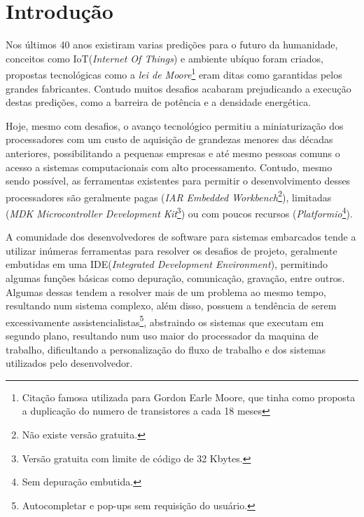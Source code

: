 \chapter{Introdução}
Nos últimos 40 anos existiram varias predições para o futuro da humanidade, conceitos como IoT(\textit{Internet Of Things})\cite{gates1995estrada} e ambiente ubíquo\cite{weiser1991computer} foram criados, propostas tecnológicas como a \textit{lei de Moore}\footnote{Citação famosa utilizada para Gordon Earle Moore, que tinha como proposta a duplicação do numero de transistores a cada 18 meses} eram ditas como garantidas pelos grandes fabricantes. Contudo muitos desafios acabaram prejudicando a execução destas predições, como a barreira de potência\cite{Patterson:2008:COD:1502247} e a densidade energética\cite{paradiso2005energy}.

Hoje, mesmo com desafios, o avanço tecnológico permitiu a miniaturização dos processadores com um custo de aquisição de grandezas menores das décadas anteriores\cite{nordhaus2007two}, possibilitando a pequenas empresas e até mesmo pessoas comuns o acesso a sistemas computacionais com alto processamento. Contudo, mesmo	 sendo possível, as ferramentas existentes para permitir o desenvolvimento desses processadores são geralmente pagas (\textit{IAR Embedded Workbench}\footnote{Não existe versão gratuita.}), limitadas (\textit{MDK Microcontroller Development Kit}\footnote{Versão gratuita com limite de código de 32 Kbytes.}) ou com poucos recursos (\textit{Platformio}\footnote{Sem depuração embutida.}).

A comunidade dos desenvolvedores de software para sistemas embarcados tende a utilizar inúmeras ferramentas para resolver os desafios de projeto, geralmente embutidas em uma IDE(\textit{Integrated Development Environment}), permitindo algumas funções básicas como depuração, comunicação, gravação, entre outros. Algumas dessas tendem a resolver mais de um problema ao mesmo tempo, resultando num sistema complexo, além disso, possuem a tendência de serem excessivamente assistencialistas\footnote{Autocompletar e pop-ups sem requisição do usuário.}, abstraindo os sistemas que executam em segundo plano, resultando num uso maior do processador da maquina de trabalho, dificultando a personalização do fluxo de trabalho e dos sistemas utilizados pelo desenvolvedor.

\iffalse
O intuito deste trabalho é a realização de um sistema para possibilitar aos desenvolvedores a programação de sistemas embarcados, sem a necessidade de utilizar sistemas assistencialistas que possam limitar a evolução do trabalho ou a utilização do produto final concebido.
\fi

